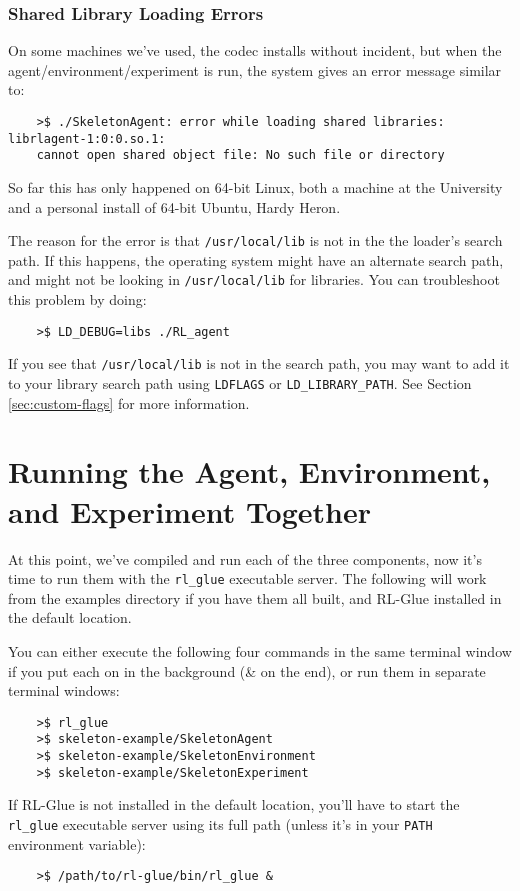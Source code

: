 \documentclass[11pt]{article}
\begin{document}
\subsubsection{Shared Library Loading Errors}
\label{sec:gotchas-shared-libs}
On some machines we've used, the codec installs without incident, but when the agent/environment/experiment is run, the system gives an error message similar to:
\begin{verbatim}
	>$ ./SkeletonAgent: error while loading shared libraries: librlagent-1:0:0.so.1:
	cannot open shared object file: No such file or directory
\end{verbatim}

So far this has only happened on 64-bit Linux, both a machine at the University
and a personal install of 64-bit Ubuntu, Hardy Heron.

The reason for the error is that \texttt{/usr/local/lib} is not in the the loader's search path.  If this happens, the operating system might have an alternate search path, and might not be looking in \texttt{/usr/local/lib} for libraries. 
You can troubleshoot this problem by doing:
\begin{verbatim}
	>$ LD_DEBUG=libs ./RL_agent
\end{verbatim}
If you see that \texttt{/usr/local/lib} is not in the search path, you may want to add it to your library search path using \texttt{LDFLAGS} or \texttt{LD\_LIBRARY\_PATH}.  See Section \ref{sec:custom-flags} for more information.  

\section{Running the Agent, Environment, and Experiment Together}
At this point, we've compiled and run each of the three components, now it's time to run them with the \texttt{rl\_glue} executable server.  The following will work from the examples directory if you have them all built, and RL-Glue installed in the default location.

You can either execute the following four commands in the same terminal window if you put each on in the background (\& on the end), or run them in separate terminal windows:
\begin{verbatim}
	>$ rl_glue
	>$ skeleton-example/SkeletonAgent 
	>$ skeleton-example/SkeletonEnvironment 
	>$ skeleton-example/SkeletonExperiment	
\end{verbatim}

If RL-Glue is not installed in the default location, you'll have to start the \texttt{rl\_glue} executable server using its full path (unless it's in your \texttt{PATH} environment variable):
\begin{verbatim}
	>$ /path/to/rl-glue/bin/rl_glue &
\end{verbatim}
\end{document}
